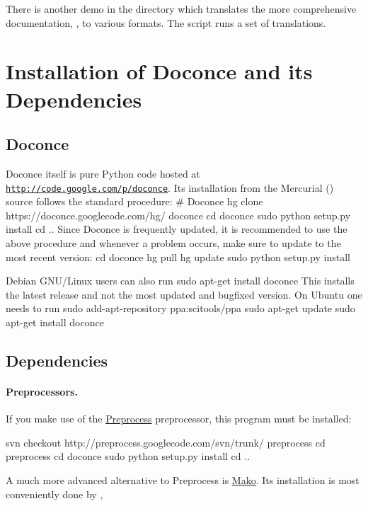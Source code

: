 \documentclass[twoside]{book}
\begin{document}
There is another demo in the  directory which
translates the more comprehensive documentation, , to
various formats. The  script runs a set of translations.


\section{Installation of Doconce and its Dependencies}

\subsection{Doconce}

Doconce itself is pure Python code hosted at \href{{http://code.google.com/p/doconce}}{\nolinkurl{http://code.google.com/p/doconce}}.  Its installation from the
Mercurial () source follows the standard procedure:
\bsys
# Doconce
hg clone https://doconce.googlecode.com/hg/ doconce
cd doconce
sudo python setup.py install
cd ..
\esys
Since Doconce is frequently updated, it is recommended to use the
above procedure and whenever a problem occurs, make sure to
update to the most recent version:
\bsys
cd doconce
hg pull
hg update
sudo python setup.py install
\esys

Debian GNU/Linux users can also run
\bsys
sudo apt-get install doconce
\esys
This installs the latest release and not the most updated and bugfixed
version.
On Ubuntu one needs to run
\bsys
sudo add-apt-repository ppa:scitools/ppa
sudo apt-get update
sudo apt-get install doconce
\esys

\subsection{Dependencies}

\paragraph{Preprocessors.}
If you make use of the \href{{http://code.google.com/p/preprocess}}{Preprocess}
preprocessor, this program must be installed:

\bsys
svn checkout http://preprocess.googlecode.com/svn/trunk/ preprocess
cd preprocess
cd doconce
sudo python setup.py install
cd ..
\esys

A much more advanced alternative to Preprocess is
\href{{http://www.makotemplates.org}}{Mako}. Its installation is most
conveniently done by ,
\end{document}
